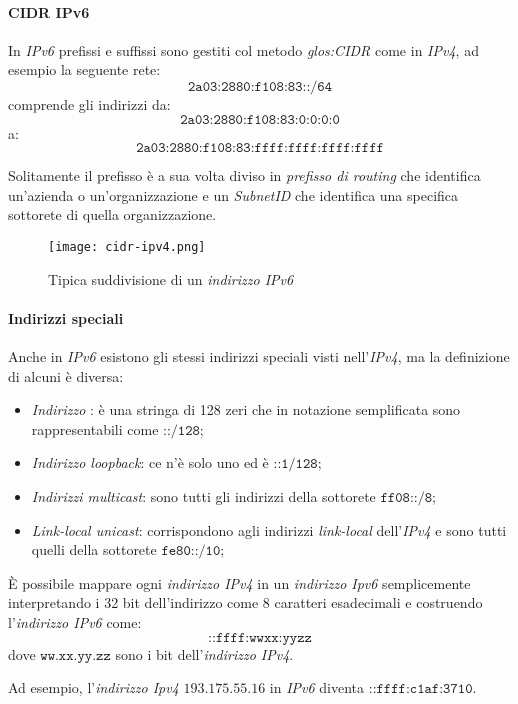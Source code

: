 \paragraph{CIDR IPv6}
In \emph{IPv6} prefissi e suffissi sono gestiti col metodo \emph{\gls{glos:CIDR}}
come in \emph{IPv4}, ad esempio la seguente rete:
\[\texttt{2a03:2880:f108:83::/64}\]
comprende gli indirizzi da:
\[\texttt{2a03:2880:f108:83:0:0:0:0}\]
a:
\[\texttt{2a03:2880:f108:83:ffff:ffff:ffff:ffff}\]

\bigskip\noindent
Solitamente il prefisso è a sua volta diviso in \emph{prefisso di routing}
che identifica un'azienda o un'organizzazione e un \emph{SubnetID} che
identifica una specifica sottorete di quella organizzazione.
\begin{figure}[ht!]
    \centering
    \texttt{[image: cidr-ipv4.png]}
    \caption{Tipica suddivisione di un \emph{indirizzo IPv6}}
\end{figure}

\paragraph{Indirizzi speciali}
Anche in \emph{IPv6} esistono gli stessi indirizzi speciali visti nell'\emph{IPv4},
ma la definizione di alcuni è diversa:
\begin{itemize}
    \item \emph{Indirizzo }: è una stringa di 128 zeri
    che in notazione semplificata sono rappresentabili come $\texttt{::/128}$;
    \item \emph{Indirizzo loopback}: ce n'è solo uno ed è $\texttt{::1/128}$;
    \item \emph{Indirizzi multicast}: sono tutti gli indirizzi della sottorete
    $\texttt{ff08::/8}$;
    \item \emph{Link-local unicast}: corrispondono agli indirizzi \emph{link-local}
    dell'\emph{IPv4} e sono tutti quelli della sottorete $\texttt{fe80::/10}$;
\end{itemize}
È possibile mappare ogni \emph{indirizzo IPv4} in un \emph{indirizzo Ipv6}
semplicemente interpretando i 32 bit dell'indirizzo come 8 caratteri esadecimali
e costruendo l'\emph{indirizzo IPv6} come:
\[\texttt{::ffff:wwxx:yyzz}\]
dove $\texttt{ww.xx.yy.zz}$ sono i bit dell'\emph{indirizzo IPv4}.

Ad esempio, l'\emph{indirizzo Ipv4} $193.175.55.16$ in \emph{IPv6} diventa
$\texttt{::ffff:c1af:3710}$.